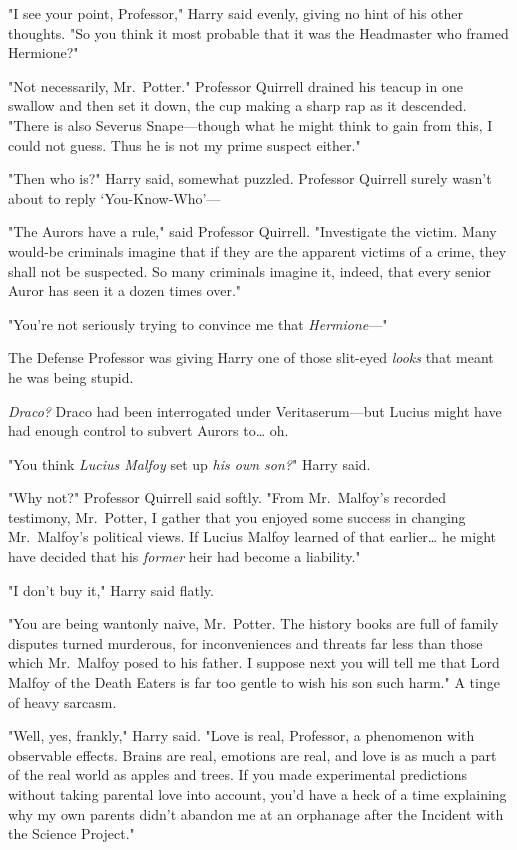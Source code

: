 "I see your point, Professor," Harry said evenly, giving no hint of his other
thoughts. "So you think it most probable that it was the Headmaster who framed
Hermione?"

"Not necessarily, Mr.~Potter." Professor Quirrell drained his teacup in one
swallow and then set it down, the cup making a sharp rap as it descended.
"There is also Severus Snape---though what he might think to gain from this, I
could not guess. Thus he is not my prime suspect either."

"Then who is?" Harry said, somewhat puzzled. Professor Quirrell surely wasn't
about to reply `You-Know-Who'---

"The Aurors have a rule," said Professor Quirrell. "Investigate the victim.
Many would-be criminals imagine that if they are the apparent victims of a
crime, they shall not be suspected. So many criminals imagine it, indeed, that
every senior Auror has seen it a dozen times over."

"You're not seriously trying to convince me that \emph{Hermione}---"

The Defense Professor was giving Harry one of those slit-eyed \emph{looks} that
meant he was being stupid.

\emph{Draco?} Draco had been interrogated under Veritaserum---but Lucius might
have had enough control to subvert Aurors to{\ldots} oh.

"You think \emph{Lucius Malfoy} set up \emph{his own son?}" Harry said.

"Why not?" Professor Quirrell said softly. "From Mr.~Malfoy's recorded
testimony, Mr.~Potter, I gather that you enjoyed some success in changing
Mr.~Malfoy's political views. If Lucius Malfoy learned of that earlier{\ldots}
he might have decided that his \emph{former} heir had become a liability."

"I don't buy it," Harry said flatly.

"You are being wantonly naive, Mr.~Potter. The history books are full of family
disputes turned murderous, for inconveniences and threats far less than those
which Mr.~Malfoy posed to his father. I suppose next you will tell me that Lord
Malfoy of the Death Eaters is far too gentle to wish his son such harm." A
tinge of heavy sarcasm.

"Well, yes, frankly," Harry said. "Love is real, Professor, a phenomenon with
observable effects. Brains are real, emotions are real, and love is as much a
part of the real world as apples and trees. If you made experimental
predictions without taking parental love into account, you'd have a heck of a
time explaining why my own parents didn't abandon me at an orphanage after the
Incident with the Science Project."

